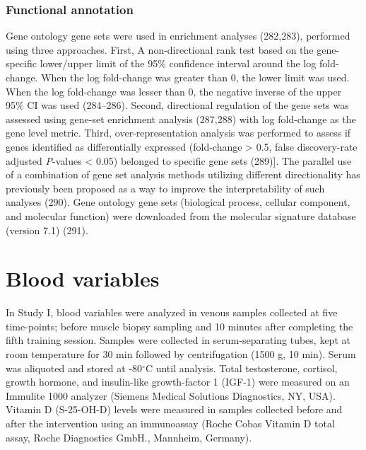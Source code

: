 \documentclass[twoside,10pt]{gihclass} %
\begin{document}
\hypertarget{functional-annotation}{%
\subsubsection{Functional annotation}\label{functional-annotation}}

Gene ontology gene sets were used in enrichment analyses
(282,283),
performed using three approaches.
First, A non-directional rank test based on the gene-specific lower/upper limit of the 95\% confidence interval around the log fold-change. When the log fold-change was greater than 0, the lower limit was used. When the log fold-change was lesser than 0, the negative inverse of the upper 95\% CI was used
(284--286).
Second, directional regulation of the gene sets was assessed using gene-set enrichment analysis
(287,288) with log fold-change as the gene level metric.
Third, over-representation analysis was performed to assess if genes identified as differentially expressed (\textbar fold-change\textbar{} \textgreater{} 0.5, false discovery-rate adjusted \emph{P}-values \textless{} 0.05) belonged to specific gene sets
(289){]}.
The parallel use of a combination of gene set analysis methods utilizing different directionality has previously been proposed as a way to improve the interpretability of such analyses
(290).
Gene ontology gene sets (biological process, cellular component, and molecular function) were downloaded from the molecular signature database (version 7.1) (291).

\hypertarget{blood-variables}{%
\section{Blood variables}\label{blood-variables}}

In Study I, blood variables were analyzed in venous samples collected at five time-points; before muscle biopsy sampling and 10 minutes after completing the fifth training session. Samples were collected in serum-separating tubes, kept at room temperature for 30 min followed by centrifugation (1500 g, 10 min). Serum was aliquoted and stored at -80\(^{\circ}\)C until analysis.
Total testosterone, cortisol, growth hormone, and insulin-like growth-factor 1 (IGF-1) were measured on an Immulite 1000 analyzer (Siemens Medical Solutions Diagnostics, NY, USA). Vitamin D (S-25-OH-D) levels were measured in samples collected before and after the intervention using an immunoassay (Roche Cobas Vitamin D total assay, Roche Diagnostics GmbH., Mannheim, Germany).
\end{document}
